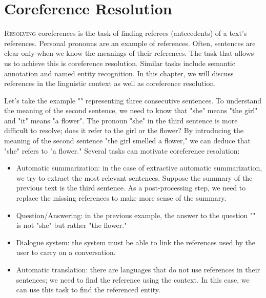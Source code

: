 \documentclass{KBook}
\begin{document}
		\mainmatter
	
\fi

\chapter{Coreference Resolution}

\begin{introduction}
	\lettrine{R}{esolving} coreferences is the task of finding referees (antecedents) of a text's references. 
	Personal pronouns are an example of references. Often, sentences are clear only when we know the meanings of their references. 
	The task that allows us to achieve this is coreference resolution. 
	Similar tasks include semantic annotation and named entity recognition. 
	In this chapter, we will discuss references in the linguistic context as well as coreference resolution.
\end{introduction} 

Let's take the example "" representing three consecutive sentences. To understand the meaning of the second sentence, we need to know that "she" means "the girl" and "it" means "a flower". The pronoun "she" in the third sentence is more difficult to resolve; does it refer to the girl or the flower? By introducing the meaning of the second sentence "the girl smelled a flower," we can deduce that "she" refers to "a flower." Several tasks can motivate coreference resolution:
\begin{itemize}
	\item Automatic summarization: in the case of extractive automatic summarization, we try to extract the most relevant sentences. Suppose the summary of the previous text is the third sentence. As a post-processing step, we need to replace the missing references to make more sense of the summary.
	\item Question/Answering: in the previous example, the answer to the question "" is not "she" but rather "the flower."
	\item Dialogue system: the system must be able to link the references used by the user to carry on a conversation.
	\item Automatic translation: there are languages that do not use references in their sentences; we need to find the reference using the context. In this case, we can use this task to find the referenced entity.
\end{itemize}
\end{document}

